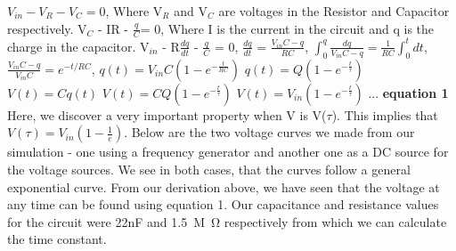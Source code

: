 \documentclass[twocolumn]{article}\usepackage[english]{babel}
\begin{document}
\(V_{in} - V_{R} - V_{C} =0\), \newline \newline Where V$_{R}$ and V$_{C}$ are voltages in the Resistor and Capacitor respectively. \newline \newline
V$_{C}$ - IR - $\frac{q}{C}$= 0, \newline \newline Where I is the current in the circuit and q is the charge in the capacitor.\newline \newline
V$_{in}$ - R$\frac{dq}{dt}$ - $\frac{q}{C}$ = 0, \newline \newline
$\frac{dq}{dt}$ = $\frac{V_{in}C-q}{RC}$, \newline \newline
\(\int_0^q \frac{dq}{V_{in}C-q} = \frac{1}{RC} \int_0^t dt\), \newline \newline
{} \newline \newline
\(\frac{V_{in}C - q}{V_{in}C} = e^{-t/RC}\), \newline \newline
\(q(t) = V_{in}C  \left(1 - e^{-\frac{t}{RC}}\right)\) \newline \newline
\(q(t)=Q\left(1 - e^{-\frac{t}{\tau}}\right)\) \newline \newline
\(V(t) = Cq(t)\) \newline \newline
\(V(t)=CQ\left(1 - e^{-\frac{t}{\tau}}\right)\) \newline \newline
\(V(t) = V_{in}\left(1 - e^{-\frac{t}{\tau}}\right)\) ... \textbf{equation 1} \newline \newline
Here, we discover a very important property when V is V($\tau$). This implies that \(V(\tau) = V_{in}\left(1 - \frac{1}{e}\right)\).
\newline \newline
Below are the two voltage curves we made from our simulation - one using a frequency generator and another one as a DC source for the voltage sources. We see in both cases, that the curves follow a general exponential curve. From our derivation above, we have seen that the voltage at any time can be found using equation 1. Our capacitance and resistance values for the circuit were 22nF and \SI{1.5}{M\ohm} respectively from which we can calculate the time constant. \newline
\end{document}
